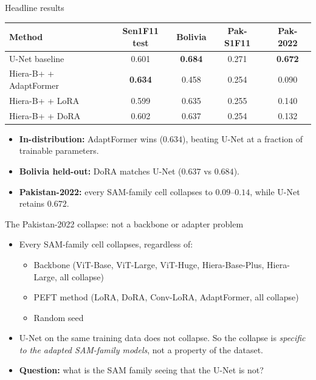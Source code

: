 \documentclass[aspectratio=169,11pt]{beamer}
\begin{document}
\begin{frame}{Headline results}
\begin{center}
\small
\begin{tabular}{lcccc}
\toprule
Method & Sen1F11 test & Bolivia & Pak-S1F11 & Pak-2022 \\
\midrule
U-Net baseline                & 0.601 & \textbf{0.684} & 0.271 & \textbf{0.672} \\
Hiera-B+ + AdaptFormer        & \textbf{0.634} & 0.458 & 0.254 & \textcolor{warn}{0.090} \\
Hiera-B+ + LoRA               & 0.599 & 0.635 & 0.255 & \textcolor{warn}{0.140} \\
Hiera-B+ + DoRA               & 0.602 & 0.637 & 0.254 & \textcolor{warn}{0.132} \\
\bottomrule
\end{tabular}
\end{center}
\vspace{0.6em}
\begin{itemize}
    \item \textbf{In-distribution:} AdaptFormer wins ($0.634$), beating U-Net at a fraction of trainable parameters.
    \item \textbf{Bolivia held-out:} DoRA matches U-Net ($0.637$ vs $0.684$).
    \item \textbf{Pakistan-2022:} every SAM-family cell collapses to \textcolor{warn}{$0.09$--$0.14$}, while U-Net retains $0.672$.
\end{itemize}
\end{frame}

\begin{frame}{The Pakistan-2022 collapse: not a backbone or adapter problem}
\begin{itemize}
    \item Every SAM-family cell collapses, regardless of:
    \begin{itemize}
        \item Backbone (ViT-Base, ViT-Large, ViT-Huge, Hiera-Base-Plus, Hiera-Large, all collapse)
        \item PEFT method (LoRA, DoRA, Conv-LoRA, AdaptFormer, all collapse)
        \item Random seed
    \end{itemize}
    \item U-Net on the same training data does not collapse. So the collapse is \emph{specific to the adapted SAM-family models}, not a property of the dataset.
    \item \textbf{Question:} what is the SAM family seeing that the U-Net is not?
\end{itemize}
\end{frame}
\end{document}
